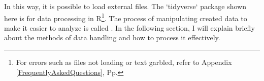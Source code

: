 \documentclass{ltjsbook}
\begin{document}
In this way, it is possible to load external files. The `tidyverse` package shown here is for data processing in R\footnote{For errors such as files not loading or text garbled, refer to Appendix \ref {FrequentlyAskedQuestions}, Pp. \pageref {FrequentlyAskedQuestions}}.
The process of manipulating created data to make it easier to analyze is called . In the following section, I will explain briefly about the methods of data handling and how to process it effectively.



\end{document}

